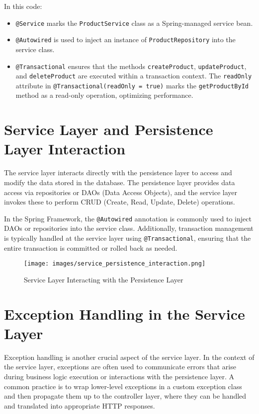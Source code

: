 \documentclass{article}
\begin{document}
In this code:

\begin{itemize}
    \item \texttt{@Service} marks the \texttt{ProductService} class as a Spring-managed service bean.
    \item \texttt{@Autowired} is used to inject an instance of \texttt{ProductRepository} into the service class.
    \item \texttt{@Transactional} ensures that the methods \texttt{createProduct}, \texttt{updateProduct}, and \texttt{deleteProduct} are executed within a transaction context. The \texttt{readOnly} attribute in \texttt{@Transactional(readOnly = true)} marks the \texttt{getProductById} method as a read-only operation, optimizing performance.
\end{itemize}

\section{Service Layer and Persistence Layer Interaction}
The service layer interacts directly with the persistence layer to access and modify the data stored in the database. The persistence layer provides data access via repositories or DAOs (Data Access Objects), and the service layer invokes these to perform CRUD (Create, Read, Update, Delete) operations. 

In the Spring Framework, the \texttt{@Autowired} annotation is commonly used to inject DAOs or repositories into the service class. Additionally, transaction management is typically handled at the service layer using \texttt{@Transactional}, ensuring that the entire transaction is committed or rolled back as needed.

\begin{figure}[H]
    \centering
    \begin{framed}
        \texttt{[image: images/service\_persistence\_interaction.png]}
    \end{framed}
    \caption{Service Layer Interacting with the Persistence Layer}
    \label{fig:service-persistence}
\end{figure}

\section{Exception Handling in the Service Layer}
Exception handling is another crucial aspect of the service layer. In the context of the service layer, exceptions are often used to communicate errors that arise during business logic execution or interactions with the persistence layer. A common practice is to wrap lower-level exceptions in a custom exception class and then propagate them up to the controller layer, where they can be handled and translated into appropriate HTTP responses.
\end{document}
